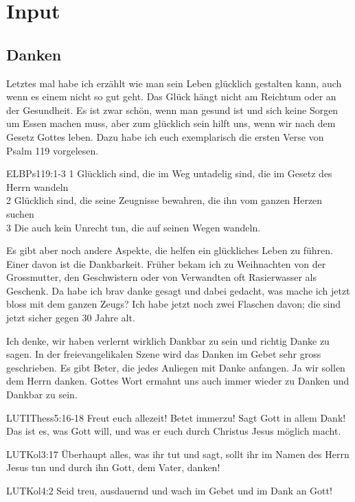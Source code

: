 \section{ Input }
\begin{spacing}{1.5}
\subsection{Danken}
Letztes mal habe ich erzählt wie man sein Leben glücklich gestalten kann, auch wenn es einem nicht so gut geht. Das Glück hängt nicht am Reichtum oder an der Gesundheit. Es ist zwar schön, wenn man gesund ist und sich keine Sorgen um Essen machen muss, aber zum glücklich sein hilft uns, wenn wir nach dem Gesetz Gottes leben. Dazu habe ich euch exemplarisch die ersten Verse von Psalm 119 vorgelesen.
\begin{bibelbox}{ELB}{Ps}{119:1-3}
1 Glücklich sind, die im Weg untadelig sind, die im Gesetz des Herrn wandeln\\
2 Glücklich sind, die seine Zeugnisse bewahren, die ihn vom ganzen Herzen suchen\\
3 Die auch kein Unrecht tun, die auf seinen Wegen wandeln.
\end{bibelbox}
Es gibt aber noch andere Aspekte, die helfen ein glückliches Leben zu führen. Einer davon ist die Dankbarkeit. Früher bekam ich zu Weihnachten von der Grossmutter, den Geschwistern oder von Verwandten oft Rasierwasser als Geschenk. Da habe ich brav danke gesagt und dabei gedacht, was mache ich jetzt bloss mit dem ganzen Zeugs? Ich habe jetzt noch zwei Flaschen davon; die sind jetzt sicher gegen 30 Jahre alt.

Ich denke, wir haben verlernt wirklich Dankbar zu sein und richtig Danke zu sagen. In der freievangelikalen Szene wird das Danken im Gebet sehr gross geschrieben. Es gibt Beter, die jedes Anliegen mit Danke anfangen. Ja wir sollen dem Herrn danken. Gottes Wort ermahnt uns auch immer wieder zu Danken und Dankbar zu sein.
\begin{bibelbox}{LUT}{IThess}{5:16-18}
Freut euch allezeit! Betet immerzu! Sagt Gott in allem Dank! Das ist es, was Gott will, und was er euch durch Christus Jesus möglich macht.
\end{bibelbox}
\begin{bibelbox}{LUT}{Kol}{3:17}
Überhaupt alles, was ihr tut und sagt, sollt ihr im Namen des Herrn Jesus tun und durch ihn Gott, dem Vater, danken!
\end{bibelbox}
\begin{bibelbox}{LUT}{Kol}{4:2}
Seid treu, ausdauernd und wach im Gebet und im Dank an Gott!
\end{bibelbox}


\end{spacing}
